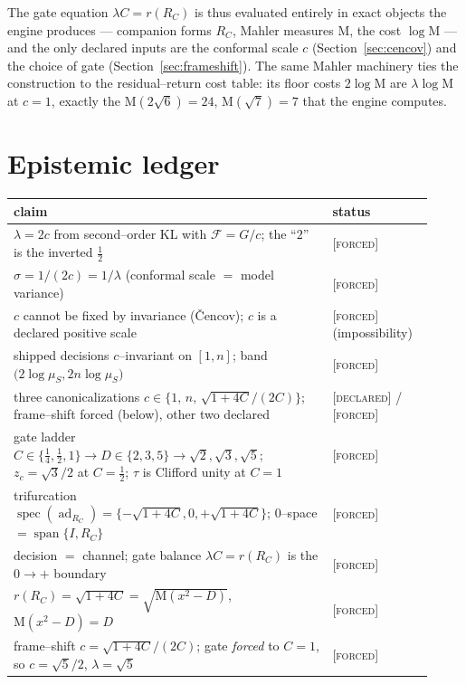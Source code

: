 \documentclass[11pt]{article}
\theoremstyle{plain}
\theoremstyle{definition}
\theoremstyle{remark}
\newcommand{\forced}{\textcolor{forcedc}{\textsc{[forced]}}}
\newcommand{\declared}{\textcolor{declaredc}{\textsc{[declared]}}}
\newcommand{\Mah}{\mathrm{M}}
\begin{document}
\noindent The gate equation $\lambda C = r(R_C)$ is thus evaluated entirely in exact objects the engine produces --- companion forms $R_C$, Mahler measures $\Mah$, the cost $\log\Mah$ --- and the only declared inputs are the conformal scale $c$ (Section~\ref{sec:cencov}) and the choice of gate (Section~\ref{sec:frameshift}). The same Mahler machinery ties the construction to the residual--return cost table: its floor costs $2\log\Mah$ are $\lambda\log\Mah$ at $c=1$, exactly the $\Mah(2\sqrt6)=24$, $\Mah(\sqrt7)=7$ that the engine computes.

\section{Epistemic ledger}\label{sec:ledger}

\begin{center}
\renewcommand{\arraystretch}{1.3}
\begin{tabular}{@{}p{0.70\linewidth}>{\raggedright\arraybackslash}p{0.22\linewidth}@{}}
\toprule
claim & status \\
\midrule
$\lambda=2c$ from second--order KL with $\mathcal F=G/c$; the ``$2$'' is the inverted $\tfrac12$ & \forced \\
$\sigma = 1/(2c) = 1/\lambda$ (conformal scale $=$ model variance) & \forced \\
$c$ cannot be fixed by invariance (\v{C}encov); $c$ is a declared positive scale & \forced{} (impossibility) \\
shipped decisions $c$--invariant on $[1,n]$; band $\bigl(2\log\mu_S,2n\log\mu_S\bigr)$ & \forced \\
three canonicalizations $c\in\{1,\,n,\,\sqrt{1+4C}/(2C)\}$; frame--shift forced (below), other two declared & \declared{} / \forced \\
gate ladder $C\in\{\tfrac14,\tfrac12,1\}\to D\in\{2,3,5\}\to\sqrt2,\sqrt3,\sqrt5$; $z_c=\sqrt3/2$ at $C=\tfrac12$; $\tau$ is Clifford unity at $C=1$ & \forced \\
trifurcation $\operatorname{spec}(\operatorname{ad}_{R_C})=\{-\sqrt{1+4C},0,+\sqrt{1+4C}\}$; $0$--space $=\operatorname{span}\{I,R_C\}$ & \forced \\
decision $=$ channel; gate balance $\lambda C=r(R_C)$ is the $0\to+$ boundary & \forced \\
$r(R_C)=\sqrt{1+4C}=\sqrt{\Mah(x^2-D)}$, $\Mah(x^2-D)=D$ & \forced \\
frame--shift $c=\sqrt{1+4C}/(2C)$; gate \emph{forced} to $C=1$, so $c=\sqrt5/2$, $\lambda=\sqrt5$ & \forced \\

\end{tabular}
\end{center}
\end{document}

